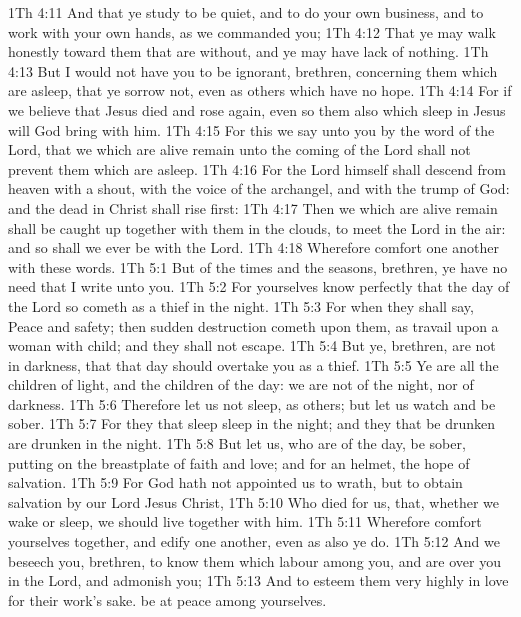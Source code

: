\vs 1Th 4:11 And that ye study to be quiet, and to do your own business, and to work with your own hands, as we commanded you;
\vs 1Th 4:12 That ye may walk honestly toward them that are without, and  ye may have lack of nothing.
\vs 1Th 4:13 But I would not have you to be ignorant, brethren, concerning them which are asleep, that ye sorrow not, even as others which have no hope.
\vs 1Th 4:14 For if we believe that Jesus died and rose again, even so them also which sleep in Jesus will God bring with him.
\vs 1Th 4:15 For this we say unto you by the word of the Lord, that we which are alive  remain unto the coming of the Lord shall not prevent them which are asleep.
\vs 1Th 4:16 For the Lord himself shall descend from heaven with a shout, with the voice of the archangel, and with the trump of God: and the dead in Christ shall rise first:
\vs 1Th 4:17 Then we which are alive  remain shall be caught up together with them in the clouds, to meet the Lord in the air: and so shall we ever be with the Lord.
\vs 1Th 4:18 Wherefore comfort one another with these words.
\vs 1Th 5:1 But of the times and the seasons, brethren, ye have no need that I write unto you.
\vs 1Th 5:2 For yourselves know perfectly that the day of the Lord so cometh as a thief in the night.
\vs 1Th 5:3 For when they shall say, Peace and safety; then sudden destruction cometh upon them, as travail upon a woman with child; and they shall not escape.
\vs 1Th 5:4 But ye, brethren, are not in darkness, that that day should overtake you as a thief.
\vs 1Th 5:5 Ye are all the children of light, and the children of the day: we are not of the night, nor of darkness.
\vs 1Th 5:6 Therefore let us not sleep, as  others; but let us watch and be sober.
\vs 1Th 5:7 For they that sleep sleep in the night; and they that be drunken are drunken in the night.
\vs 1Th 5:8 But let us, who are of the day, be sober, putting on the breastplate of faith and love; and for an helmet, the hope of salvation.
\vs 1Th 5:9 For God hath not appointed us to wrath, but to obtain salvation by our Lord Jesus Christ,
\vs 1Th 5:10 Who died for us, that, whether we wake or sleep, we should live together with him.
\vs 1Th 5:11 Wherefore comfort yourselves together, and edify one another, even as also ye do.
\vs 1Th 5:12 And we beseech you, brethren, to know them which labour among you, and are over you in the Lord, and admonish you;
\vs 1Th 5:13 And to esteem them very highly in love for their work's sake.  be at peace among yourselves.
